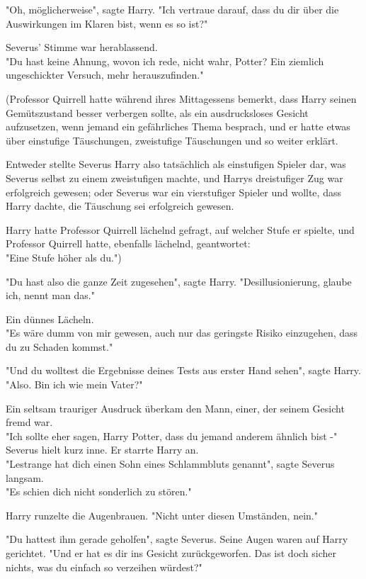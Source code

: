 {"Oh, möglicherweise", sagte Harry. "Ich vertraue darauf, dass du dir über die Auswirkungen im Klaren bist, wenn es so ist?"

Severus' Stimme war herablassend.\\ "Du hast keine Ahnung, wovon ich rede, nicht wahr, Potter? Ein ziemlich ungeschickter Versuch, mehr herauszufinden."

(Professor Quirrell hatte während ihres Mittagessens bemerkt, dass Harry seinen Gemütszustand besser verbergen sollte, als ein ausdrucksloses Gesicht aufzusetzen, wenn jemand ein gefährliches Thema besprach, und er hatte etwas über einstufige Täuschungen, zweistufige Täuschungen und so weiter erklärt.

Entweder stellte Severus Harry also tatsächlich als einstufigen Spieler dar, was Severus selbst zu einem zweistufigen machte, und Harrys dreistufiger Zug war erfolgreich gewesen; oder Severus war ein vierstufiger Spieler und wollte, dass\\ Harry dachte, die Täuschung sei erfolgreich gewesen.

Harry hatte Professor Quirrell lächelnd gefragt, auf welcher Stufe er spielte, und Professor Quirrell hatte, ebenfalls lächelnd, geantwortet:\\ "Eine Stufe höher als du.")

"Du hast also die ganze Zeit zugesehen", sagte Harry. "Desillusionierung, glaube ich, nennt man das."

Ein dünnes Lächeln.\\ "Es wäre dumm von mir gewesen, auch nur das geringste Risiko einzugehen, dass du zu Schaden kommst."

"Und du wolltest die Ergebnisse deines Tests aus erster Hand sehen", sagte Harry.\\ "Also. Bin ich wie mein Vater?"

Ein seltsam trauriger Ausdruck überkam den Mann, einer, der seinem Gesicht fremd war.\\ "Ich sollte eher sagen, Harry Potter, dass du jemand anderem ähnlich bist -"\\ Severus hielt kurz inne. Er starrte Harry an.\\ "Lestrange hat dich einen Sohn eines Schlammbluts genannt", sagte Severus langsam.\\ "Es schien dich nicht sonderlich zu stören."

Harry runzelte die Augenbrauen. "Nicht unter diesen Umständen, nein."

"Du hattest ihm gerade geholfen", sagte Severus. Seine Augen waren auf Harry gerichtet. "Und er hat es dir ins Gesicht zurückgeworfen. Das ist doch sicher nichts, was du einfach so verzeihen würdest?"

}
